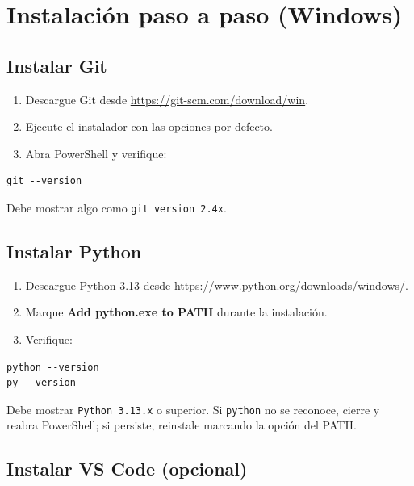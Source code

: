 \documentclass[11pt,a4paper]{article}
\newcommand{\campo}[1]{\texttt{\small #1}}
\begin{document}
\section{Instalación paso a paso (Windows)}

\subsection{Instalar Git}

\begin{enumerate}[leftmargin=1.4em]
  \item Descargue Git desde \url{https://git-scm.com/download/win}.
  \item Ejecute el instalador con las opciones por defecto.
  \item Abra PowerShell y verifique:
\end{enumerate}

\begin{lstlisting}
git --version
\end{lstlisting}

Debe mostrar algo como \campo{git version 2.4x}.

\subsection{Instalar Python}

\begin{enumerate}[leftmargin=1.4em]
  \item Descargue Python 3.13 desde
        \url{https://www.python.org/downloads/windows/}.
  \item Marque \textbf{Add python.exe to PATH} durante la instalación.
  \item Verifique:
\end{enumerate}

\begin{lstlisting}
python --version
py --version
\end{lstlisting}

Debe mostrar \campo{Python 3.13.x} o superior. Si \campo{python} no se reconoce,
cierre y reabra PowerShell; si persiste, reinstale marcando la opción del PATH.

\subsection{Instalar VS Code (opcional)}
\end{document}
